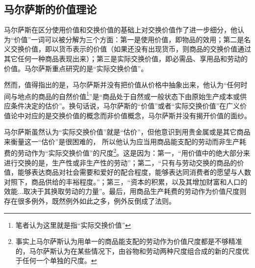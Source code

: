 \subsection{马尔萨斯的价值理论}

马尔萨斯在区分使用价值和交换价值的基础上对交换价值作了进一步细分，他认为“价值”一词可以被分解为三个方面：第一是使用价值，即物品的效用；第二是名义交换价值，即以货币表示的价值（如果还没有出现货币，则商品的交换价值通过其它任何一种商品表现出来\cite[32]{BiLuo*SiLaFaDaWeiLiJiaTuQuanJiDi2JuanMaErSaSiZhengZhiJingJiXueYuanLiPingZhu2013}）；第三是实际交换价值，即必需品、享用品和劳动的价值。\cite[42]{BiLuo*SiLaFaDaWeiLiJiaTuQuanJiDi2JuanMaErSaSiZhengZhiJingJiXueYuanLiPingZhu2013}马尔萨斯重点研究的是“实际交换价值”。

然而，值得指出的是，马尔萨斯并没有把价值从价格中抽象出来，他认为“任何时间与地点的商品的自然价值\footnote{笔者认为这里就是指“实际交换价值”}”是“商品处于自然或一般状态下由原始生产成本或供应条件决定的估价”\cite[132]{MaErSaSiZhengZhiJingJiXueDingYi2023}。换句话说，马尔萨斯的“价值”或者“实际交换价值”在广义价值论中对应的是交换价值的概念而非价值概念，马尔萨斯并没有揭开价值的面纱。

马尔萨斯虽然认为“实际交换价值”就是“估价”，但他意识到用贵金属或是其它商品来衡量这一“估价”是很困难的\cite[98]{BiLuo*SiLaFaDaWeiLiJiaTuQuanJiDi2JuanMaErSaSiZhengZhiJingJiXueYuanLiPingZhu2013}，
所以他认为应当用商品能支配的劳动而非生产耗费的劳动作为“实际交换价值”的尺度\footnote{事实上马尔萨斯认为用单一的商品能支配的劳动作为价值尺度都是不够精准的，马尔萨斯认为在某些情况下，由谷物和劳动两种尺度组合成的新的尺度优于任何一个单独的尺度\cite[98-105]{BiLuo*SiLaFaDaWeiLiJiaTuQuanJiDi2JuanMaErSaSiZhengZhiJingJiXueYuanLiPingZhu2013}。}\cite[60-82, 92-97]{BiLuo*SiLaFaDaWeiLiJiaTuQuanJiDi2JuanMaErSaSiZhengZhiJingJiXueYuanLiPingZhu2013}\cite[133]{MaErSaSiZhengZhiJingJiXueDingYi2023}。这是因为：第一，“用价值中的绝大部分来进行交换的是，生产性或非生产性的劳动”\cite[92]{BiLuo*SiLaFaDaWeiLiJiaTuQuanJiDi2JuanMaErSaSiZhengZhiJingJiXueYuanLiPingZhu2013}；第二，“只有与劳动交换的商品的价值，能够表达商品对社会需要和爱好的配合程度，能够表达同消费者的愿望与人数对照下，商品供给的丰裕程度。”\cite[92]{BiLuo*SiLaFaDaWeiLiJiaTuQuanJiDi2JuanMaErSaSiZhengZhiJingJiXueYuanLiPingZhu2013}；第三，“资本的积累，以及其增加财富和人口的效能...取决于其换取劳动的力量”\cite[93]{BiLuo*SiLaFaDaWeiLiJiaTuQuanJiDi2JuanMaErSaSiZhengZhiJingJiXueYuanLiPingZhu2013}。最后，用商品生产耗费的劳动作为价值尺度则存在很多例外\cite[60-82]{BiLuo*SiLaFaDaWeiLiJiaTuQuanJiDi2JuanMaErSaSiZhengZhiJingJiXueYuanLiPingZhu2013}，既然例外如此之多，例外反倒成了法则\cite[171]{CaiJiMingCongGuDianZhengZhiJingJiXueDaoZhongGuoTeSeSheHuiZhuYiZhengZhiJingJiXueJiYuZhongGuoShiJiaoDeZhengZhiJingJiXueYanBianShangCe2023}。

